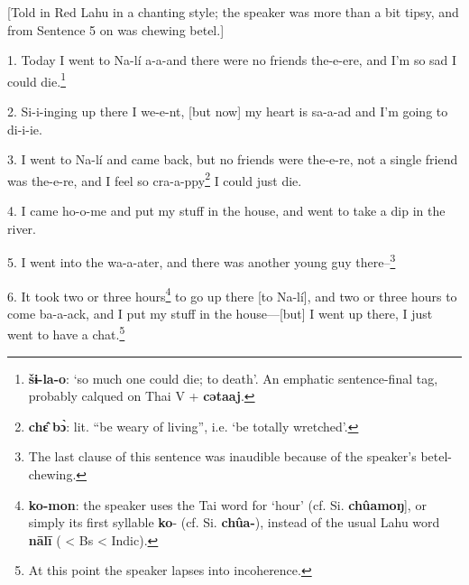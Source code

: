 \setcounter{footnote}{0}

[Told in Red Lahu in a chanting style; the speaker was more than a bit tipsy, and
from Sentence 5 on was chewing betel.]

1. Today I went to Na-lí a-a-and there were no friends the-e-ere, and I'm so sad
I could die.\footnote{\textbf{šɨ-la-o}: `so much one could die; to death'. An emphatic sentence-final tag, probably calqued on Thai V + \textbf{cətaaj}.}

2. Si-i-inging up there I we-e-nt, [but now] my heart is sa-a-ad and I'm going
to di-i-ie.

3. I went to Na-lí and came back, but no friends were the-e-re, not a single friend
was the-e-re, and I feel so cra-a-ppy\footnote{\textbf{chɛ̂} \textbf{bɔ̀}: lit. ``be weary of living'', i.e. `be totally wretched'.} I could just die.

4. I came ho-o-me and put my stuff in the house, and went to take a dip in the
river.

5. I went into the wa-a-ater, and there was another young guy there--\footnote{The last clause of this sentence was inaudible because of the speaker's betel-chewing.}

6. It took two or three hours\footnote{\textbf{ko-mon}: the speaker uses the Tai word for `hour' (cf. Si. \textbf{chûamoŋ}], or simply its first syllable \textbf{ko}- (cf. Si. \textbf{chûa-}), instead of the usual Lahu word \textbf{nālī} ( < Bs < Indic).} to go up there [to Na-lí], and two or three
hours to come ba-a-ack, and I put my stuff in the house---[but] I went up there,
I just went to have a chat.\footnote{At this point the speaker lapses into incoherence.}

